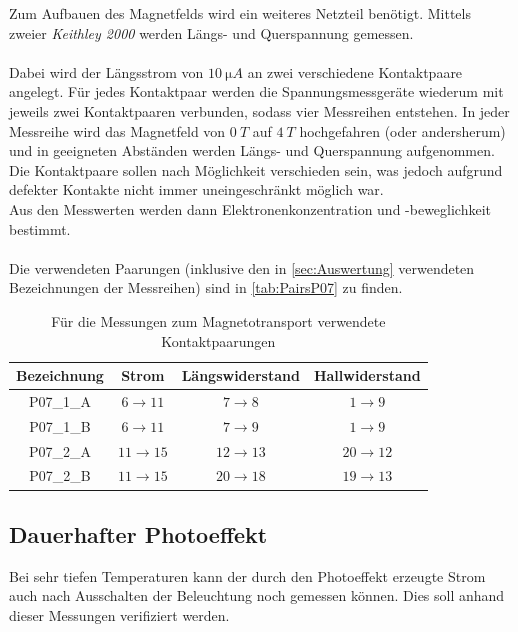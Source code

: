 Zum Aufbauen des Magnetfelds wird ein weiteres Netzteil benötigt.
Mittels zweier \emph{Keithley 2000} werden Längs- und Querspannung gemessen.\\\\
Dabei wird der Längsstrom von $10\ \si{\micro A}$ an zwei verschiedene Kontaktpaare angelegt.
Für jedes Kontaktpaar werden die Spannungsmessgeräte wiederum mit jeweils zwei Kontaktpaaren verbunden, sodass vier Messreihen entstehen.
In jeder Messreihe wird das Magnetfeld von $0\ \si{T}$ auf $4\ \si{T}$ hochgefahren (oder andersherum) und in geeigneten Abständen werden Längs- und Querspannung aufgenommen.
Die Kontaktpaare sollen nach Möglichkeit verschieden sein, was jedoch aufgrund defekter Kontakte nicht immer uneingeschränkt möglich war.\\
Aus den Messwerten werden dann Elektronenkonzentration und -beweglichkeit bestimmt.\\\\
Die verwendeten Paarungen (inklusive den in \autoref{sec:Auswertung} verwendeten Bezeichnungen der Messreihen) sind in \autoref{tab:PairsP07} zu finden.\\

\begin{table}[ht]
\caption{Für die Messungen zum Magnetotransport verwendete Kontaktpaarungen}
\label{tab:PairsP07}
\centering
\begin{tabular}{cccc}
\toprule
Bezeichnung & Strom & Längswiderstand & Hallwiderstand\\
\midrule
P07\_1\_A & $6\rightarrow 11$ & $7\rightarrow 8$ & $1\rightarrow 9$\\
P07\_1\_B & $6\rightarrow 11$ & $7\rightarrow 9$ & $1\rightarrow 9$\\
P07\_2\_A & $11\rightarrow 15$ & $12\rightarrow 13$ & $20\rightarrow 12$\\
P07\_2\_B & $11\rightarrow 15$ & $20\rightarrow 18$ & $19\rightarrow 13$\\
\bottomrule
\end{tabular}
\end{table}
\subsection{Dauerhafter Photoeffekt}\label{sec:Photoeffekt}
Bei sehr tiefen Temperaturen kann der durch den Photoeffekt erzeugte Strom auch nach Ausschalten der Beleuchtung noch gemessen können.
Dies soll anhand dieser Messungen verifiziert werden.

